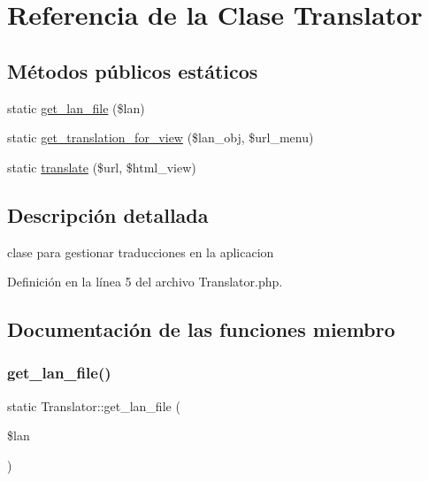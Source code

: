 \hypertarget{class_translator}{}\section{Referencia de la Clase Translator}
\label{class_translator}
\subsection*{Métodos públicos estáticos}
\begin{DoxyCompactItemize}
\item 
static \mbox{\hyperlink{class_translator_a359e93b0f7c7037893c54e5c1df94a79}{get\+\_\+lan\+\_\+file}} (\$lan)
\item 
static \mbox{\hyperlink{class_translator_a58b9a1f4ddada4fcd2a0a302f902f791}{get\+\_\+translation\+\_\+for\+\_\+view}} (\$lan\+\_\+obj, \$url\+\_\+menu)
\item 
static \mbox{\hyperlink{class_translator_a9304be95639cc658a31a56dbfdd5ac7b}{translate}} (\$url, \$html\+\_\+view)
\end{DoxyCompactItemize}


\subsection{Descripción detallada}
clase para gestionar traducciones en la aplicacion 

Definición en la línea 5 del archivo Translator.\+php.



\subsection{Documentación de las funciones miembro}
\mbox{\label{class_translator_a359e93b0f7c7037893c54e5c1df94a79}} 
\subsubsection{\texorpdfstring{get\_lan\_file()}{get\_lan\_file()}}
{\footnotesize\ttfamily static Translator\+::get\+\_\+lan\+\_\+file (\begin{DoxyParamCaption}\item[{}]{\$lan }\end{DoxyParamCaption})\hspace{0.3cm}{\ttfamily [static]}}

